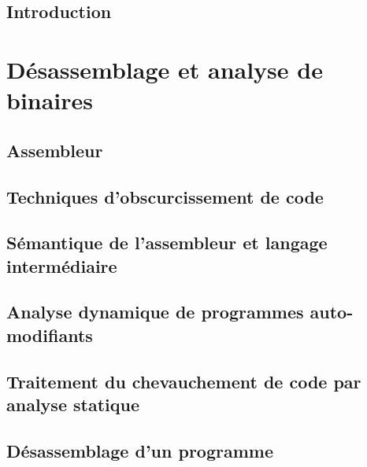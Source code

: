 \DontFrameThisInToc
\chapter*{Introduction\label{chap:introduction}}


\part{Désassemblage et analyse de binaires}

\DontFrameThisInToc
\chapter{Assembleur\label{chap:assembleur}}


\DontFrameThisInToc
\chapter{Techniques d'obscurcissement de code\label{chap:obscurcissement}}


\DontFrameThisInToc
\chapter{Sémantique de l'assembleur et langage intermédiaire\label{chap:semantique}}


\DontFrameThisInToc
\chapter{Analyse dynamique de programmes auto-modifiants\label{chap:auto-modification}}


\DontFrameThisInToc
\chapter{Traitement du chevauchement de code par analyse statique\label{chap:chevauchement}}


\DontFrameThisInToc
\chapter{Désassemblage d'un programme \sm\label{chap:desassembleur}}


